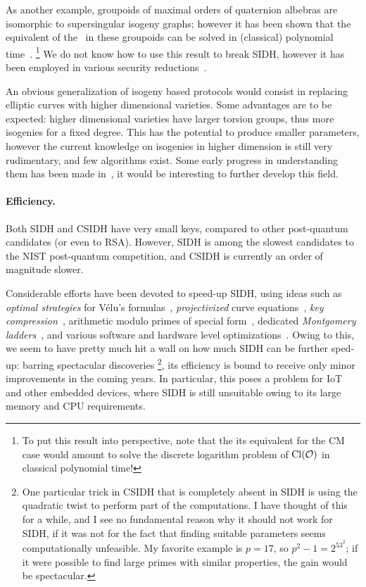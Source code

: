 \documentclass{report}
\theoremstyle{plain}
\theoremstyle{definition}
\begin{document}
As another example, groupoids of maximal orders of quaternion albebras
are isomorphic to supersingular isogeny graphs; however it has been
shown that the equivalent of the~ in these groupoids
can be solved in (classical) polynomial
time~\cite{kohel2014quaternion}.%
\footnote{To put this result into perspective, note that the its
  equivalent for the CM case would amount to solve the discrete
  logarithm problem of $\operatorname{Cl}(\mathcal{O})$ in classical polynomial time!} %
We do not know how to use this result to break SIDH, however it has
been employed in various security
reductions~\cite{galbraithsecurity,cryptoeprint:2017:962}.

An obvious generalization of isogeny based protocols would consist in
replacing elliptic curves with higher dimensional varieties. %
Some advantages are to be expected: higher dimensional varieties have
larger torsion groups, thus more isogenies for a fixed degree. %
This has the potential to produce smaller parameters, however the
current knowledge on isogenies in higher dimension is still very
rudimentary, and few algorithms exist. %
Some early progress in understanding them has been made
in~\cite{lubicz_robert_2012,lubicz_robert_2015,cosset2015computing,ionica2014isogeny,Brooks2017},
it would be interesting to further develop this field. %

\paragraph{Efficiency.}
Both SIDH and CSIDH have very small keys, compared to other
post-quantum candidates (or even to RSA). %
However, SIDH is among the slowest candidates to the NIST post-quantum
competition, and CSIDH is currently an order of magnitude slower. %

Considerable efforts have been devoted to speed-up SIDH, using ideas
such as \emph{optimal strategies} for Vélu's
formulas~\cite{defeo+jao+plut12}, \emph{projectivized} curve
equations~\cite{costello2016sidh}, \emph{key
  compression}~\cite{azarderakhsh2016key,Costello2017,10.1007/978-3-319-79063-3_12},
arithmetic modulo primes of special
form~\cite{costello2016sidh,vercauteren-sidh-fp,8023082}, dedicated
\emph{Montgomery ladders}~\cite{flor_sidh_x64}, and various software
and hardware level optimizations~\cite{cryptoeprint:2017:1213}. %
Owing to this, we seem to have pretty much hit a wall on how much SIDH
can be further sped-up: barring spectacular discoveries%
\footnote{One particular trick in CSIDH that is completely absent in
  SIDH is using the quadratic twist to perform part of the
  computations. %
  I have thought of this for a while, and I see no fundamental reason
  why it should not work for SIDH, if it was not for the fact that
  finding suitable parameters seems computationally unfeasible. %
  My favorite example is $p=17$, so $p^2-1=2^53^2$; if it were
  possible to find large primes with similar properties, the gain
  would be spectacular.}, %
its efficiency is bound to receive only minor improvements in the
coming years. %
In particular, this poses a problem for IoT and other embedded
devices, where SIDH is still unsuitable owing to its large memory and
CPU requirements. %
\end{document}
